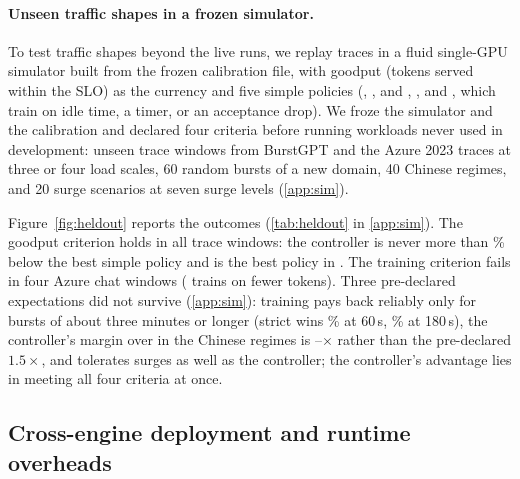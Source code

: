 \paragraph{Unseen traffic shapes in a frozen simulator.}\label{sec:heldout} To test traffic shapes beyond the live runs, we replay traces in a fluid single-GPU simulator built from the frozen calibration file, with goodput (tokens served within the SLO) as the currency and five simple policies (, , and , , and , which train on idle time, a timer, or an acceptance drop). We froze the simulator and the calibration and declared four criteria before running workloads never used in development:  unseen trace windows from BurstGPT \citep{wang2024burstgpt} and the Azure 2023 traces \citep{patel2024splitwise} at three or four load scales, 60 random bursts of a new domain, 40 Chinese regimes, and 20 surge scenarios at seven surge levels (\cref{app:sim}).

Figure~\ref{fig:heldout} reports the outcomes (\cref{tab:heldout} in \cref{app:sim}). The goodput criterion holds in all  trace windows: the controller is never more than \% below the best simple policy and is the best policy in . The training criterion fails in four Azure chat windows ( trains on fewer tokens). Three pre-declared expectations did not survive (\cref{app:sim}): training pays back reliably only for bursts of about three minutes or longer (strict wins \% at 60\,s, \% at 180\,s), the controller's margin over  in the  Chinese regimes is --$\times$ rather than the pre-declared $1.5\times$, and  tolerates surges as well as the controller; the controller's advantage lies in meeting all four criteria at once.

\subsection{Cross-engine deployment and runtime overheads}\label{sec:sglang}

\begin{table}[t]
\caption{SGLang: phase-B throughput relative to  (paired mean $\pm$ sd, \%; best in bold) and the worst ratio to the scenario's best policy.}
\label{tab:sgl_main}
\centering\footnotesize\setlength{\tabcolsep}{3pt}
\end{table}

